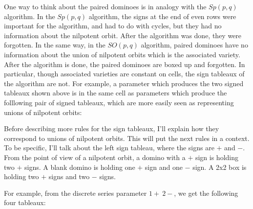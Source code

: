 \documentclass[12pt]{article}
\newcommand{\eps}{.06}
\newcommand{\teps}{\eps * 2}
\newcommand{\horizontalDomino}[3]{\filldraw [dominoStyle] (#2 - 1 + \eps, #1 - 1 + \eps) rectangle + (2 - \teps, 1 -\teps) node [dominoText] {$#3$};}
\newcommand{\verticalDomino}[3]{\filldraw [dominoStyle] (#2 - 1 + \eps,  #1 - 1 + \eps) rectangle + (1 - \teps,2 -\teps) node [dominoText] {$#3$};}
\newcommand{\horizontalDominoShift}[4]{\filldraw [dominoStyle] (#2 - 1 + #4 + \eps, #1 - 1 + \eps) rectangle + (2 - \teps, 1 -\teps) node [dominoText] {$#3$};}
\newcommand{\verticalDominoShift}[4]{\filldraw [dominoStyle] (#2 - 1 + #4 + \eps,  #1 - 1 + \eps) rectangle + (1 - \teps,2 -\teps) node [dominoText] {$#3$};}
\newcommand{\emptyBox}[2]{\filldraw [dominoStyle] (#2 - 1 + \eps, #1 - 1 + \eps) rectangle + (2 - \teps, 2 -\teps);}
\newcommand{\emptyBoxShift}[3]{\filldraw [dominoStyle] (#2 - 1 + #3 + \eps, #1 - 1 + \eps) rectangle + (2 - \teps, 2 -\teps);}
\newcommand{\horizontalGridLine}[3]{\draw [gridLine] (#1, #2) -- + (#3,0);}
\newcommand{\verticalGridLine}[2]{\draw [gridLine] (#1, 0) -- + (0,#2);}
\newcommand{\fixedSquare}[2]{\filldraw [fixedSquareStyle] (#1,#2) rectangle +(1,1);}
\newcommand{\gridLines}[2] {
  \pgfmathsetmacro{\verticalEnd}{2 * #1}
  \pgfmathsetmacro{\horizontalEnd}{2 * #2}
  \foreach \vertical in {0,...,#2} {
    \pgfmathsetmacro{\var} {2 * \vertical}
    \verticalGridLine{\var}{\verticalEnd}
  }
  \foreach \horizontal in {0,...,#1} {
    \pgfmathsetmacro{\var} {2 * \horizontal}
    \horizontalGridLine{0}{\var}{\horizontalEnd}
  }
}
\newcommand{\gridLinesShift}[3] {
  \pgfmathsetmacro{\verticalEnd}{2 * #1}
  \pgfmathsetmacro{\horizontalEnd}{2 * #2}
  \foreach \vertical in {0,...,#2} {
    \pgfmathsetmacro{\var} {2 * \vertical + #3}
    \verticalGridLine{\var}{\verticalEnd}
  }
  \foreach \horizontal in {0,...,#1} {
    \pgfmathsetmacro{\var} {2 * \horizontal}
    \horizontalGridLine{#3}{\var}{\horizontalEnd}
  }
}
\newcommand{\fixedSquaresStart}[4]{
  \foreach \row in {#1,...,#2} {
    \foreach \column in {#3,...,#4} {
      \pgfmathsetmacro{\var}{\row + \column}
      \ifodd \var
      \else
        \fixedSquare\column\row
      \fi
    }
  }
}
\newcommand{\fixedSquares}[2]{
  \foreach \row in {0,...,#1} {
    \foreach \column in {0,...,#2} {
      \pgfmathsetmacro{\var}{\row + \column}
      \ifodd \var
        \fixedSquare\column\row
      \fi
    }
  }
}
\newcommand{\fixedSquaresForGrid}[2] {
  \pgfmathsetmacro{\rowParameter}{#1 * 2 - 1}
  \pgfmathsetmacro{\columnParameter}{#2 * 2 - 1}
  \fixedSquares{\rowParameter}{\columnParameter}
}
\newcommand{\fixedSquaresForGridShift}[3] {
  \pgfmathsetmacro{\rowParameter}{#1 * 2 - 1}
  \pgfmathsetmacro{\columnStart}{#3}
  \pgfmathsetmacro{\columnEnd}{#2 * 2 - 1 + #3}
  \fixedSquaresStart{0}{\rowParameter}{\columnStart}{\columnEnd}
}
\newcommand{\fixedSquaresStartAlt}[4]{
  \foreach \row in {#1,...,#2} {
    \foreach \column in {#3,...,#4} {
      \pgfmathsetmacro{\var}{\row + \column + 1}
      \ifodd \var
      \else
        \fixedSquare\column\row
      \fi
    }
  }
}
\newcommand{\fixedSquaresForGridShiftAlt}[3] {
  \pgfmathsetmacro{\rowParameter}{#1 * 2 - 1}
  \pgfmathsetmacro{\columnStart}{#3}
  \pgfmathsetmacro{\columnEnd}{#2 * 2 - 1 + #3}
  \fixedSquaresStartAlt{0}{\rowParameter}{\columnStart}{\columnEnd}
}
\begin{document}
  One way to think about the paired dominoes is in analogy with the $Sp(p,q)$ algorithm.
  In the $Sp(p,q)$ algorithm, the signs at the end of even rows were important for the algorithm, and had to do with cycles, but they had no information about the nilpotent orbit.
  After the algorithm was done, they were forgotten.
  In the same way, in the $SO(p,q)$ algorithm, paired dominoes have no information about the union of nilpotent orbits which is the associated variety.
  After the algorithm is done, the paired dominoes are boxed up and forgotten.
  In particular, though associated varieties are constant on cells, the sign tableaux of the algorithm are not.
  For example, a parameter which produces the two signed tableaux shown above is in the same cell as parameters which produce the folllowing pair of signed tableaux, which are more easily seen as representing unions of nilpotent orbits:
  \begin{figure}[H]
    \centering
  \end{figure}

  Before describing more rules for the sign tableaux, I'll explain how they correspond to unions of nilpotent orbits.
  This will put the next rules in a context.
  To be specific, I'll talk about the left sign tableau, where the signs are $+$ and $-$.
  From the point of view of a nilpotent orbit, a domino with a $+$ sign is holding two $+$ signs.
  A blank domino is holding one $+$ sign and one $-$ sign.
  A 2x2 box is holding two $+$ signs and two $-$ signs.

  For example, from the discrete series parameter $1{+}\ 2-$, we get the following four tableaux:
  \begin{figure}[H]
    \centering
  \end{figure}
\end{document}
